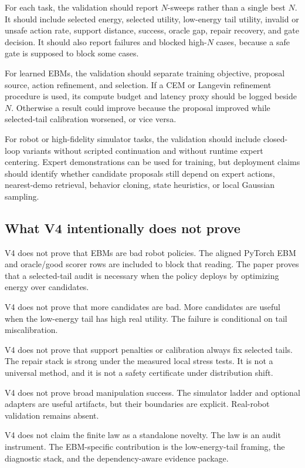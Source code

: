 For each task, the validation should report \(N\)-sweeps rather than a single
best \(N\). It should include selected energy, selected utility, low-energy
tail utility, invalid or unsafe action rate, support distance, success, oracle
gap, repair recovery, and gate decision. It should also report failures and
blocked high-\(N\) cases, because a safe gate is supposed to block some cases.

For learned EBMs, the validation should separate training objective, proposal
source, action refinement, and selection. If a CEM or Langevin refinement
procedure is used, its compute budget and latency proxy should be logged
beside \(N\). Otherwise a result could improve because the proposal improved
while selected-tail calibration worsened, or vice versa.

For robot or high-fidelity simulator tasks, the validation should include
closed-loop variants without scripted continuation and without runtime expert
centering. Expert demonstrations can be used for training, but deployment
claims should identify whether candidate proposals still depend on expert
actions, nearest-demo retrieval, behavior cloning, state heuristics, or local
Gaussian sampling.

\subsection{What V4 intentionally does not prove}
\label{app:V4-not-proved}

V4 does not prove that EBMs are bad robot policies. The aligned PyTorch EBM and
oracle/good scorer rows are included to block that reading. The paper proves
that a selected-tail audit is necessary when the policy deploys by optimizing
energy over candidates.

V4 does not prove that more candidates are bad. More candidates are useful when
the low-energy tail has high real utility. The failure is conditional on tail
miscalibration.

V4 does not prove that support penalties or calibration always fix selected
tails. The repair stack is strong under the measured local stress tests. It is
not a universal method, and it is not a safety certificate under distribution
shift.

V4 does not prove broad manipulation success. The simulator ladder and optional
adapters are useful artifacts, but their boundaries are explicit. Real-robot
validation remains absent.

V4 does not claim the finite law as a standalone novelty. The law is an audit
instrument. The EBM-specific contribution is the low-energy-tail framing, the
diagnostic stack, and the dependency-aware evidence package.

